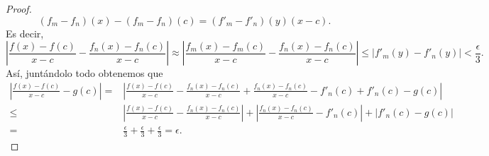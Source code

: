 \begin{proof}
\[\left(f_{m}-f_{n}\right)\left(x\right)-\left(f_{m}-f_{n}\right)\left(c\right) = \left(f'_{m}-f'_{n}\right)\left(y\right)\left(x-c\right) .\]
Es decir, 
\[ \left|\frac{f\left(x\right)-f\left(c\right)}{x-c} - \frac{f_{n}\left(x\right)-f_{n}\left(c\right)}{x-c}\right|\approx \left|\frac{f_{m}\left(x\right)-f_{m}\left(c\right)}{x-c} -\frac{f_{n}\left(x\right)-f_{n}\left(c\right)}{x-c}\right| \leq \left|f'_{m}\left(y\right)-f'_{n}\left(y\right)\right| < \frac{\epsilon }{3}  .\]
Así, juntándolo todo obtenemos que
\[
\begin{split}
	\left|\frac{f\left(x\right)-f\left(c\right)}{x-c}-g\left(c\right)\right| = & \left|\frac{f\left(x\right)-f\left(c\right)}{x-c} - \frac{f_{n}\left(x\right)-f_{n}\left(c\right)}{x-c}+\frac{f_{n}\left(x\right)-f_{n}\left(c\right)}{x-c}-f'_{n}\left(c\right)+f'_{n}\left(c\right)-g\left(c\right)\right|\\
	\leq & \left|\frac{f\left(x\right)-f\left(c\right)}{x-c} - \frac{f_{n}\left(x\right)-f_{n}\left(c\right)}{x-c}\right| + \left|\frac{f_{n}\left(x\right)-f_{n}\left(c\right)}{x-c}-f'_{n}\left(c\right)\right| + \left|f'_{n}\left(c\right)-g\left(c\right)\right| \\
	= & \frac{\epsilon }{3} + \frac{\epsilon }{3} + \frac{\epsilon }{3} = \epsilon .
\end{split}
\]
\end{proof}
